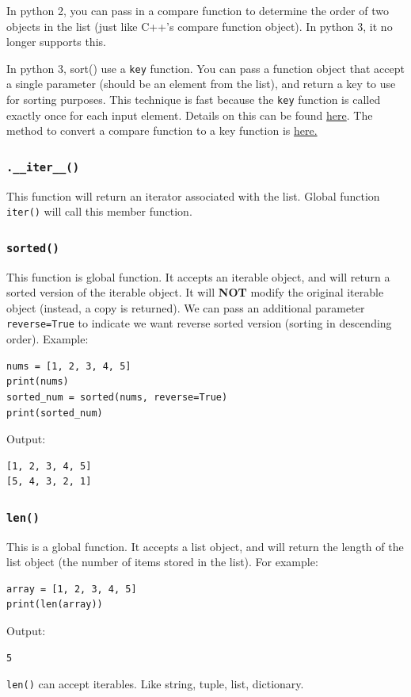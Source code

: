\documentclass[12pt]{book}
\begin{document}
In python 2, you can pass in a compare function to determine the order of two objects in the list (just like C++'s compare function object). In python 3, it no longer supports this.

In python 3, sort() use a \texttt{key} function. You can pass a function object that accept a single parameter (should be an element from the list), and return a key to use for sorting purposes. This technique is fast because the \texttt{key} function is called exactly once for each input element. Details on this can be found \href{https://docs.python.org/3/howto/sorting.html\#key-functions}{here}. The method to convert a compare function to a key function is \href{https://docs.python.org/3/howto/sorting.html\#the-old-way-using-the-cmp-parameter}{here.
}
\subsubsection{\texttt{.\_\_iter\_\_()}}
\label{sec:orgedc2491}
This function will return an iterator associated with the list. Global function \texttt{iter()} will call this member function.
\subsubsection{\texttt{sorted()}}
\label{sec:org5b2a0ef}
This function is global function. It accepts an iterable object, and will return a sorted version of the iterable object. It will \textbf{NOT} modify the original iterable object (instead, a copy is returned). We can pass an additional parameter \texttt{reverse=True} to indicate we want reverse sorted version (sorting in descending order). Example:
\begin{verbatim}
nums = [1, 2, 3, 4, 5]
print(nums)
sorted_num = sorted(nums, reverse=True)
print(sorted_num)
\end{verbatim}
Output:
\begin{verbatim}
[1, 2, 3, 4, 5]
[5, 4, 3, 2, 1]
\end{verbatim}

\subsubsection{\texttt{len()}}
\label{sec:orga0b81c5}
This is a global function. It accepts a list object, and will return the length of the list object (the number of items stored in the list). For example:
\begin{verbatim}
array = [1, 2, 3, 4, 5]
print(len(array))
\end{verbatim}
Output:
\begin{verbatim}
5
\end{verbatim}
\texttt{len()} can accept iterables. Like string, tuple, list, dictionary.
\end{document}
